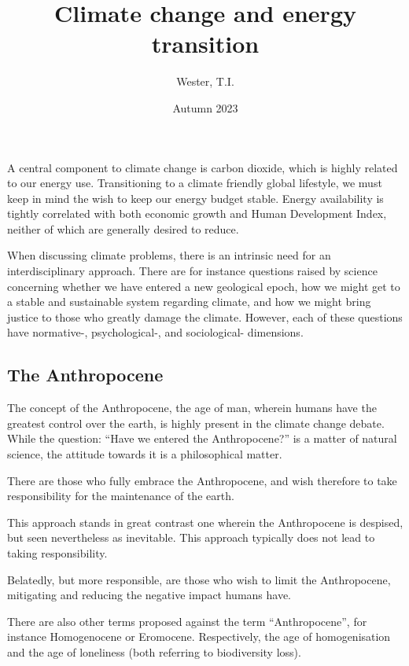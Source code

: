 \documentclass[12pt]{report}
\title{Climate change and energy transition}
\date{Autumn 2023}
\author{Wester, T.I.}
\begin{document}
\maketitle
\tableofcontents

\chapter{}

A central component to climate change is carbon dioxide, which is highly related
to our energy use. Transitioning to a climate friendly global lifestyle, we must
keep in mind the wish to keep our energy budget stable. Energy availability is
tightly correlated with both economic growth and Human Development Index,
neither of which are generally desired to reduce.

When discussing climate problems, there is an intrinsic need for an
interdisciplinary approach. There are for instance questions raised by science
concerning whether we have entered a new geological epoch, how we might get to a
stable and sustainable system regarding climate, and how we might bring justice
to those who greatly damage the climate. However, each of these questions have
normative-, psychological-,  and sociological- dimensions.

\section{The Anthropocene}

The concept of the Anthropocene, the age of man, wherein humans have the
greatest control over the earth, is highly present in the climate change debate.
While the question: ``Have we entered the Anthropocene?'' is a matter of natural
science, the attitude towards it is a philosophical matter.

There are those who fully embrace the Anthropocene, and wish therefore to take
responsibility for the maintenance of the earth.

This approach stands in great contrast one wherein the Anthropocene is despised,
but seen nevertheless as inevitable. This approach typically does not lead to
taking responsibility.

Belatedly, but more responsible, are those who wish to limit the Anthropocene,
mitigating and reducing the negative impact humans have.

\bigskip

There are also other terms proposed against the term ``Anthropocene'', for
instance Homogenocene or Eromocene. Respectively, the age of homogenisation
and the age of loneliness (both referring to biodiversity loss).
\end{document}
